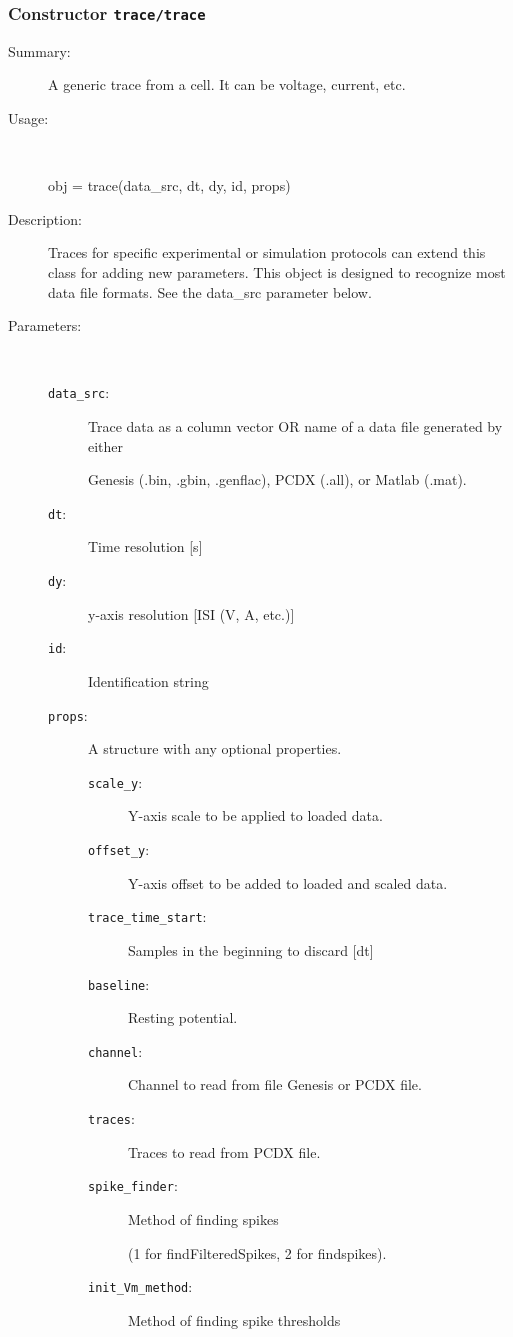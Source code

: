 \subsubsection[Constructor \texttt{trace}]{Constructor \texttt{trace/trace}}%
%
\label{ref_trace__trace}%
\hypertarget{ref_trace__trace}{}%
\begin{description}
\item[Summary:]A generic trace from a cell. It can be voltage, current, etc.
%
\item[Usage:]~%
\begin{lyxcode}%
obj = trace(data\_src, dt, dy, id, props)
%
\end{lyxcode}%
%
\item[Description:]%
Traces for specific experimental or simulation protocols can extend 
 this class for adding new parameters. This object is designed to recognize
 most data file formats. See the data\_src parameter below.
\item[Parameters:]~
\begin{description}%
\item[\texttt{data\_src}:]
 Trace data as a column vector OR name of a data file generated by either 

Genesis (.bin, .gbin, .genflac), PCDX (.all), or Matlab (.mat).\item[\texttt{dt}:]
 Time resolution [s]
\item[\texttt{dy}:]
 y-axis resolution [ISI (V, A, etc.)]
\item[\texttt{id}:]
 Identification string
\item[\texttt{props}:]
 A structure with any optional properties.
\begin{description}%
\item[\texttt{scale\_y}:]
 Y-axis scale to be applied to loaded data.
\item[\texttt{offset\_y}:]
 Y-axis offset to be added to loaded and scaled data.
\item[\texttt{trace\_time\_start}:]
 Samples in the beginning to discard [dt]
\item[\texttt{baseline}:]
 Resting potential.
\item[\texttt{channel}:]
 Channel to read from file Genesis or PCDX file.
\item[\texttt{traces}:]
 Traces to read from PCDX file.
\item[\texttt{spike\_finder}:]
 Method of finding spikes 

(1 for findFilteredSpikes, 2 for findspikes).\item[\texttt{init\_Vm\_method}:]
 Method of finding spike thresholds 


\end{description}
\end{description}
\end{description}
